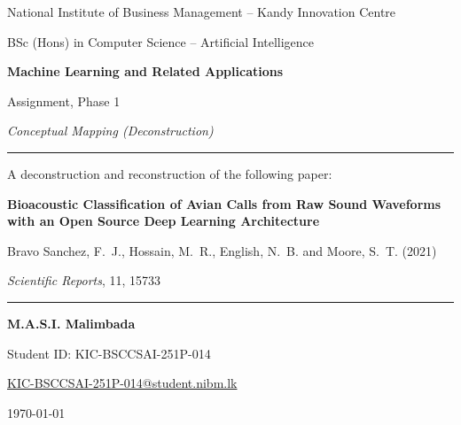 \documentclass[11pt]{article}
\begin{document}
\begin{titlepage}
\centering
\thispagestyle{empty}

\vspace*{1.5cm}
{\large National Institute of Business Management -- Kandy Innovation Centre \par}
\vspace{0.3cm}
{\normalsize BSc (Hons) in Computer Science -- Artificial Intelligence \par}

\vspace{2.5cm}
{\Large \bfseries Machine Learning and Related Applications \par}
\vspace{0.4cm}
{\large Assignment, Phase 1 \par}
\vspace{0.2cm}
{\large \itshape Conceptual Mapping (Deconstruction) \par}

\vspace{2.5cm}
\rule{\linewidth}{0.6pt} \par
\vspace{0.4cm}
{\normalsize A deconstruction and reconstruction of the following paper: \par}
\vspace{0.5cm}
{\large \bfseries Bioacoustic Classification of Avian Calls from Raw Sound Waveforms with an Open Source Deep Learning Architecture \par}
\vspace{0.4cm}
{\normalsize Bravo Sanchez, F.~J., Hossain, M.~R., English, N.~B. and Moore, S.~T. (2021) \par}
{\normalsize \textit{Scientific Reports}, 11, 15733 \par}
\vspace{0.4cm}
\rule{\linewidth}{0.6pt} \par

\vfill

{\large \bfseries M.A.S.I. Malimbada \par}
\vspace{0.3cm}
{\normalsize Student ID: KIC-BSCCSAI-251P-014 \par}
\vspace{0.2cm}
{\normalsize \href{mailto:KIC-BSCCSAI-251P-014@student.nibm.lk}{KIC-BSCCSAI-251P-014@student.nibm.lk} \par}

\vspace{1.5cm}
{\normalsize \today \par}

\end{titlepage}
\end{document}
